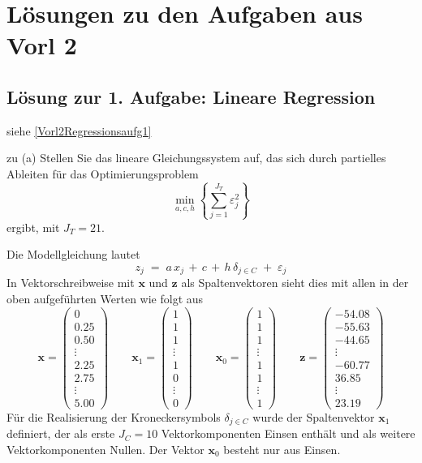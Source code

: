 \section{Lösungen zu den Aufgaben aus Vorl 2}
\subsection{Lösung zur 1. Aufgabe: Lineare Regression}
siehe \ref{Vorl2Regressionsaufg1}

zu (a) Stellen Sie das lineare Gleichungssystem auf, das sich durch partielles Ableiten
für das Optimierungsproblem
$$
\min\limits_{a,c,h} \left\{\sum_{j=1}^{J_T} \varepsilon_j^2\right\}
$$
ergibt, mit $J_T = 21$.

Die Modellgleichung lautet
\begin{equation}
z_j \; = \; a \, x_j \, + \, c \, + \, h \, \delta_{j \in C} \; + \; \varepsilon_j
\label{Modellgl1}
\end{equation}
In Vektorschreibweise mit $\boldsymbol x$ und $\boldsymbol z$ als Spaltenvektoren sieht 
dies mit allen in der oben aufgeführten Werten wie folgt aus
$$
\boldsymbol x = \left(
\begin{array}{c}
0\\
0.25\\
0.50\\
\vdots\\
2.25\\
2.75\\
\vdots\\
5.00
\end{array}\right) \qquad
\boldsymbol x_1 = \left(
\begin{array}{c}
1\\
1\\
1\\
\vdots\\
1\\
0\\
\vdots\\
0
\end{array}\right)  \qquad
\boldsymbol x_0 = \left(
\begin{array}{c}
1\\
1\\
1\\
\vdots\\
1\\
1\\
\vdots\\
1
\end{array}\right) \qquad
\boldsymbol z = \left(
\begin{array}{c}
-54.08\\
-55.63\\
-44.65\\
\vdots\\
-60.77\\
36.85\\
\vdots\\
23.19
\end{array}\right)
$$
Für die Realisierung der Kroneckersymbols $\delta_{j \in C}$ wurde
der Spaltenvektor $\boldsymbol x_1$ definiert, der als erste
$J_C = 10$ Vektorkomponenten Einsen enthält und als weitere Vektorkomponenten Nullen.
Der Vektor $\boldsymbol x_0$ besteht nur aus Einsen.

